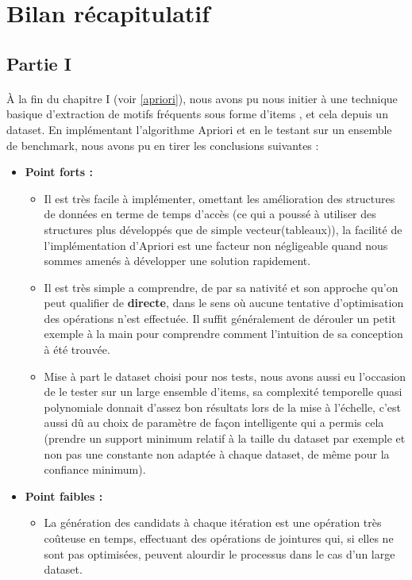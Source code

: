 \documentclass[12pt]{report}
\begin{document}
	\section{Bilan récapitulatif}
		\subsection{Partie I}
		\paragraph{}
		À la fin du chapitre I (voir \ref{apriori}), nous avons pu nous initier à une technique basique d'extraction de motifs fréquents sous forme d'items , et cela depuis un dataset. En implémentant l'algorithme Apriori et en le testant sur un ensemble de benchmark, nous avons pu en tirer les conclusions suivantes : 
		\begin{itemize}
			\item \textbf{Point forts :} 
			 \begin{itemize}
				\item Il est très facile à implémenter, omettant les amélioration des structures de données en terme de temps d'accès (ce qui a poussé à utiliser des structures plus développés que de simple vecteur(tableaux)), la facilité de l'implémentation d'Apriori est une facteur non négligeable quand nous sommes amenés à développer une solution rapidement.
				\item Il est très simple a comprendre, de par sa nativité et son approche qu'on peut qualifier de \textbf{directe}, dans le sens où aucune tentative d'optimisation des opérations n'est effectuée. Il suffit généralement de dérouler un petit exemple à la main pour comprendre comment l'intuition de sa conception à été trouvée. 
				\item Mise à part le dataset choisi pour nos tests, nous avons aussi eu l'occasion de le tester sur un large ensemble d'items, sa complexité temporelle quasi polynomiale donnait d'assez bon résultats lors de la mise à l'échelle, c'est aussi dû au choix de paramètre de façon intelligente qui a permis cela (prendre un support minimum relatif à la taille du dataset par exemple et non pas une constante non adaptée à chaque dataset, de même pour la confiance minimum). 
			\end{itemize}
			\item \textbf{Point faibles : }
				\begin{itemize}
					\item  La génération des candidats à chaque itération est une opération très coûteuse en temps, effectuant des opérations de jointures qui, si elles ne sont pas optimisées, peuvent alourdir le processus dans le cas d'un large dataset.

\end{itemize}
\end{itemize}
\end{document}
